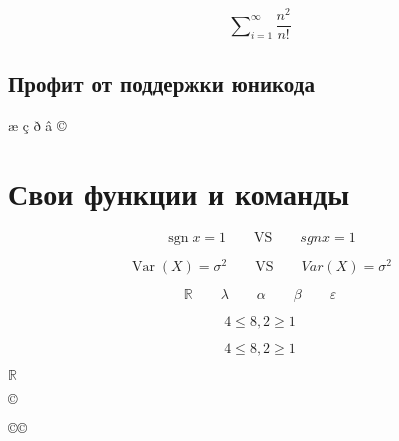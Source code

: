 \documentclass[12pt, a4paper]{article}
\DeclareMathOperator{\sgn}{sgn}
\DeclareMathOperator{\Var}{Var}
\begin{document}
\[ \sum\nolimits_{i=1}^{\infty} \frac{n^2}{n!} \]




\subsection{Профит от поддержки юникода}

æ ç ð â ©


\section{Свои функции и команды}

\def\R{\ensuremath{\mathbb{R}}} 

\def\F{\ensuremath{\mathcal{F}}{ }} 

\def \a{\alpha}
\def \b{\beta}
\def \la{\lambda}
\def \sg{\sigma}
\def \e{\varepsilon}

\[\sgn  x = 1 \qquad \text{VS} \qquad sgn x = 1\]

\[\Var(X) = \sigma^2 \qquad \text{VS} \qquad Var(X) = \sigma^2\]

\[ \R \qquad \la \qquad \a \qquad \b \qquad \e \]

\[ 4 \le 8, 2 \ge 1\]


\renewcommand{\le}{\leqslant}
\renewcommand{\ge}{\geqslant}

\[ 4 \le 8, 2 \ge 1\]


\R

\def \ccc{©}

\newcommand{\сс}{©}

$ \ccc $ 

\сс   $\сс$
\end{document}
